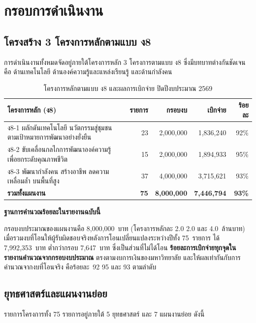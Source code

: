 \chapter{กรอบการดำเนินงาน}

\section{โครงสร้าง 3 โครงการหลักตามแบบ ง8}
การดำเนินงานทั้งหมดจัดอยู่ภายใต้โครงการหลัก 3 โครงการตามแบบ ง8 ซึ่งมีบทบาทต่างกันชัดเจน
คือ ด้านเทคโนโลยี ด้านองค์ความรู้และแหล่งเรียนรู้ และด้านกำลังคน

\begin{table}[H]
\centering
\caption{โครงการหลักตามแบบ ง8 และผลการเบิกจ่าย ปิดปีงบประมาณ 2569}
\small
\begin{tabular}{L{6.0cm}rrrr}
\toprule
{}
\textbf{โครงการหลัก (ง8)} & \textbf{รายการ} & \textbf{กรอบงบ} & \textbf{เบิกจ่าย} & \textbf{ร้อยละ}\\
\midrule
ง8-1 ผลักดันเทคโนโลยี นวัตกรรมสู่ชุมชน ตามเป้าหมายการพัฒนาอย่างยั่งยืน & 23 & 2,000,000 & 1,836,240 & 92\%\\
ง8-2 ขับเคลื่อนกลไกการพัฒนาองค์ความรู้ เพื่อยกระดับคุณภาพชีวิต & 15 & 2,000,000 & 1,894,933 & 95\%\\
ง8-3 พัฒนากำลังคน สร้างอาชีพ ลดความเหลื่อมล้ำ บนพื้นที่สูง & 37 & 4,000,000 & 3,715,621 & 93\%\\
\midrule
{}
\textbf{รวมทั้งแผนงาน} & \textbf{75} & \textbf{8,000,000} & \textbf{7,446,794} & \textbf{93\%}\\
\bottomrule
\end{tabular}
\end{table}

\begin{infobox}
\textbf{ฐานการคำนวณร้อยละในรายงานฉบับนี้}\par
กรอบงบประมาณของแผนงานคือ 8,000,000~บาท (โครงการหลักละ 2.0 2.0 และ 4.0~ล้านบาท)
เมื่อรวมงบที่โอนให้ผู้รับผิดชอบจริงหลังการโอนเปลี่ยนแปลงระหว่างปีทั้ง 75~รายการ
ได้ 7,992,353~บาท ต่ำกว่ากรอบ 7,647~บาท ซึ่งเป็นส่วนที่ไม่ได้โอน
\textbf{ร้อยละการเบิกจ่ายทุกจุดในรายงานคำนวณจากกรอบงบประมาณ} ตรงตามงบการเงินของมหาวิทยาลัย
และให้ผลเท่ากันกับการคำนวณจากงบที่โอนจริง คือร้อยละ~92 95 และ 93 ตามลำดับ
\end{infobox}

\section{ยุทธศาสตร์และแผนงานย่อย}
รายการโครงการทั้ง 75 รายการอยู่ภายใต้ 5 ยุทธศาสตร์ และ 7 แผนงานย่อย ดังนี้

